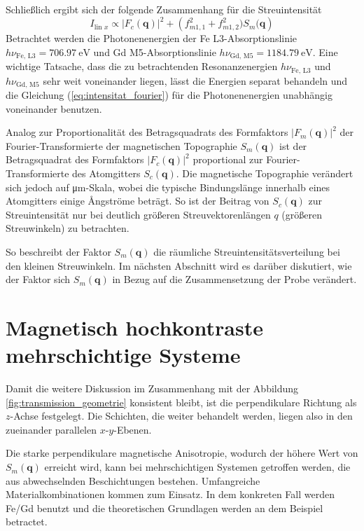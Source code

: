 \noindent
Schließlich ergibt sich der folgende Zusammenhang für die Streuintensität 
\begin{equation}
    I_{\text{lin $x$}} \propto  \left| F_c(\mathbf{q}) \right|^2 + \left(f_{m1,1}^2 + f_{m1,2}^2)S_m(\mathbf{q}\right)
    \label{eq:intensitat_fourier}
\end{equation}
Betrachtet werden die Photonenenergien der Fe L3-Absorptionslinie $h\nu_{\text{Fe, L3}} = \SI{706.97}{\eV}$ und Gd M5-Absorptionslinie $h\nu_{\text{Gd, M5}} = \SI{1184.79}{\eV}$. Eine wichtige Tatsache, dass die zu betrachtenden Resonanzenergien $h\nu_{\text{Fe, L3}}$ und  $h\nu_{\text{Gd, M5}}$ sehr weit voneinander liegen, lässt die Energien separat behandeln und die Gleichung (\ref{eq:intensitat_fourier}) für die Photonenenergien unabhängig voneinander benutzen. 

\noindent
Analog zur Proportionalität des Betragsquadrats des Formfaktors $\left|F_m(\mathbf{q})\right|^2$ der Fourier-Trans\-for\-mier\-te der magnetischen Topographie $S_m(\mathbf{q})$ ist der Betragsquadrat des Formfaktors $\left|F_c(\mathbf{q})\right|^2$ proportional zur Fourier-Transformierte des Atomgitters $S_c(\mathbf{q})$. Die magnetische Topographie verändert sich jedoch auf \si{\micro\meter}-Skala, wobei die typische Bindungslänge innerhalb eines Atomgitters einige Ångströme beträgt. So ist der Beitrag von $S_c(\mathbf{q})$ zur Streuintensität nur bei deutlich größeren Streuvektorenlängen $q$ (größeren Streuwinkeln) zu betrachten.%

\noindent
So beschreibt der Faktor $S_m(\mathbf{q})$ die räumliche Streuintensitätsverteilung bei den kleinen Streuwinkeln. Im nächsten Abschnitt wird es darüber diskutiert, wie der Faktor sich $S_m(\mathbf{q})$ in Bezug auf die Zusammensetzung der Probe verändert.

\section{Magnetisch hochkontraste mehrschichtige Systeme}
Damit die weitere Diskussion im Zusammenhang mit der Abbildung \ref{fig:transmission_geometrie} konsistent bleibt, ist die perpendikulare Richtung als $z$-Achse festgelegt. Die Schichten, die weiter behandelt werden, liegen also in den zueinander parallelen $x$-$y$-Ebenen. 

\noindent
Die starke perpendikulare magnetische Anisotropie, wodurch der höhere Wert von $S_m(\mathbf{q})$ erreicht wird, kann bei mehrschichtigen Systemen getroffen werden, die aus abwechselnden Beschichtungen bestehen. Umfangreiche Materialkombinationen kommen zum Einsatz. In dem konkreten Fall werden Fe/Gd benutzt und die theoretischen Grundlagen werden an dem Beispiel betractet.

